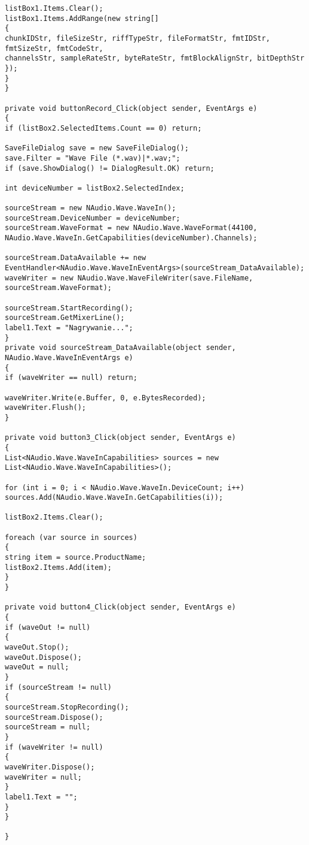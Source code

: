\documentclass[12pt]{article}
\begin{document}
\begin{verbatim}
listBox1.Items.Clear();
listBox1.Items.AddRange(new string[]
{
chunkIDStr, fileSizeStr, riffTypeStr, fileFormatStr, fmtIDStr, fmtSizeStr, fmtCodeStr,
channelsStr, sampleRateStr, byteRateStr, fmtBlockAlignStr, bitDepthStr
});
}
}

private void buttonRecord_Click(object sender, EventArgs e)
{
if (listBox2.SelectedItems.Count == 0) return;

SaveFileDialog save = new SaveFileDialog();
save.Filter = "Wave File (*.wav)|*.wav;";
if (save.ShowDialog() != DialogResult.OK) return;

int deviceNumber = listBox2.SelectedIndex;

sourceStream = new NAudio.Wave.WaveIn();
sourceStream.DeviceNumber = deviceNumber;
sourceStream.WaveFormat = new NAudio.Wave.WaveFormat(44100, NAudio.Wave.WaveIn.GetCapabilities(deviceNumber).Channels);

sourceStream.DataAvailable += new EventHandler<NAudio.Wave.WaveInEventArgs>(sourceStream_DataAvailable);
waveWriter = new NAudio.Wave.WaveFileWriter(save.FileName, sourceStream.WaveFormat);

sourceStream.StartRecording();
sourceStream.GetMixerLine();
label1.Text = "Nagrywanie...";
}
private void sourceStream_DataAvailable(object sender, NAudio.Wave.WaveInEventArgs e)
{
if (waveWriter == null) return;

waveWriter.Write(e.Buffer, 0, e.BytesRecorded);
waveWriter.Flush();
}

private void button3_Click(object sender, EventArgs e)
{
List<NAudio.Wave.WaveInCapabilities> sources = new List<NAudio.Wave.WaveInCapabilities>();

for (int i = 0; i < NAudio.Wave.WaveIn.DeviceCount; i++)
sources.Add(NAudio.Wave.WaveIn.GetCapabilities(i));

listBox2.Items.Clear();

foreach (var source in sources)
{
string item = source.ProductName;
listBox2.Items.Add(item);
}
}

private void button4_Click(object sender, EventArgs e)
{
if (waveOut != null)
{
waveOut.Stop();
waveOut.Dispose();
waveOut = null;
}
if (sourceStream != null)
{
sourceStream.StopRecording();
sourceStream.Dispose();
sourceStream = null;
}
if (waveWriter != null)
{
waveWriter.Dispose();
waveWriter = null;
}
label1.Text = "";
}
}

} 

\end{verbatim}
\newpage
\end{document}
